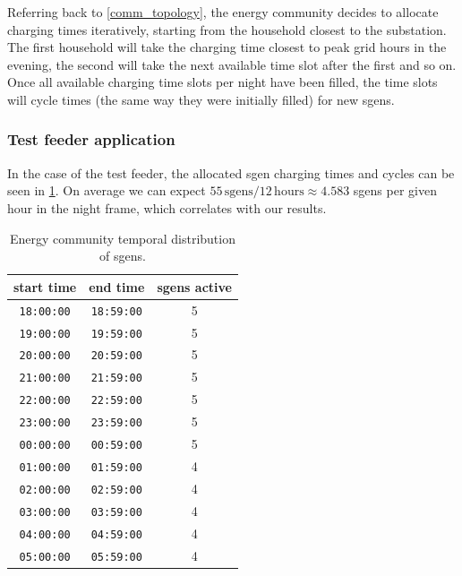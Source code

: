 \documentclass[a4paper,10pt]{report}
\begin{document}
Referring back to \cref{comm_topology}, the energy community decides to allocate charging times iteratively, starting from the household closest to the substation. The first household will take the charging time closest to peak grid hours in the evening, the second will take the next available time slot after the first and so on. Once all available charging time slots per night have been filled, the time slots will cycle times (the same way they were initially filled) for new sgens.

\subsubsection{Test feeder application}
In the case of the test feeder, the allocated sgen charging times and cycles can be seen in \cref{sgen_comm_times}. On average we can expect $55\, \text{sgens} / 12\, \text{hours} \approx 4.583$ sgens per given hour in the night frame, which correlates with our results.

\begin{table}[htpb]
	\centering
	\begin{tabular}{c c c}
		\toprule
		start time & end time & sgens active \\
		\midrule
		\texttt{18:00:00} & \texttt{18:59:00} & 5\\
		\texttt{19:00:00} & \texttt{19:59:00} & 5\\
		\texttt{20:00:00} & \texttt{20:59:00} & 5\\
		\texttt{21:00:00} & \texttt{21:59:00} & 5\\
		\texttt{22:00:00} & \texttt{22:59:00} & 5\\
		\texttt{23:00:00} & \texttt{23:59:00} & 5\\
		\texttt{00:00:00} & \texttt{00:59:00} & 5\\
		\texttt{01:00:00} & \texttt{01:59:00} & 4\\
		\texttt{02:00:00} & \texttt{02:59:00} & 4\\
		\texttt{03:00:00} & \texttt{03:59:00} & 4\\
		\texttt{04:00:00} & \texttt{04:59:00} & 4\\
		\texttt{05:00:00} & \texttt{05:59:00} & 4\\
		\bottomrule
	\end{tabular}
	\caption[Energy community temporal distribution of sgens]{Energy community temporal distribution of sgens.}
	\label{sgen_comm_times}
\end{table}
\end{document}
